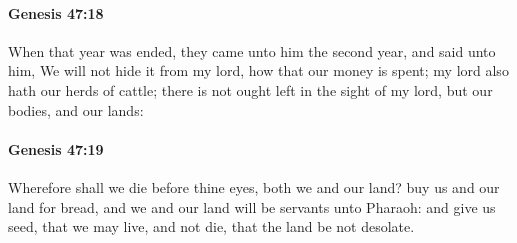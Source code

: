 		\paragraph{Genesis 47:18} %
			\label{GENESIS-47-18}

			When that year was ended, they came unto him the second year, and said unto him, We will not hide it from my lord, how that our money is spent; my lord also hath our herds of cattle; there is not ought left in the sight of my lord, but our bodies, and our lands:


		\paragraph{Genesis 47:19} %
			\label{GENESIS-47-19}

			Wherefore shall we die before thine eyes, both we and our land? buy us and our land for bread, and we and our land will be servants unto Pharaoh: and give us seed, that we may live, and not die, that the land be not desolate.

